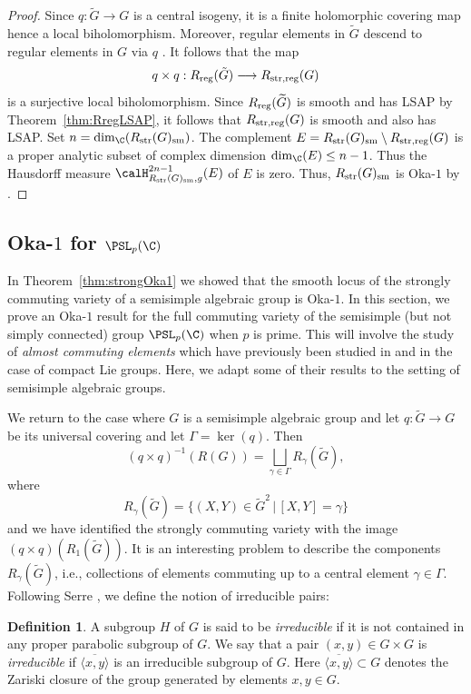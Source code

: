 \documentclass[12pt, a4paper, oneside]{amsart}
\theoremstyle{plain} %
\theoremstyle{definition} %
\newtheorem{definition}[theorem]{Definition}
\theoremstyle{remark} %
\begin{document}
\begin{proof}
Since $q:\widetilde{G}\to G$ is a central isogeny, it is a finite holomorphic covering map hence a local biholomorphism. Moreover, regular elements in $\widetilde{G}$ descend to regular elements in $G$ via $q$ \cite[Proposition 2.3 (2)]{Kur78}. It follows that the map
\[q\times q:R_{\rm reg}(\tilde{G})\longrightarrow R_{\rm str, reg}(G)\]
is a surjective local biholomorphism. Since $R_{\rm reg}(\widetilde{G})$ is smooth and has LSAP by Theorem~\ref{thm:RregLSAP}, it follows that $R_{\rm str, reg}(G)$ is smooth and also has LSAP. Set $n=\dim_\C(R_{\rm str}(G)_{\rm sm})$. The complement $E =R_{\rm str}(G)_{\rm sm}\setminus R_{\rm str, reg}(G)$ is a proper analytic subset of complex dimension $\dim_\C(E)\leq n-1$. Thus the Hausdorff measure $\calH^{2n-1}_{R_{\rm str}(G)_{\rm sm},g}(E)$ of $E$ is zero. Thus, $R_{\rm str}(G)_{\rm sm}$ is Oka-$1$ by \cite[Proposition 7.13  (b)]{AF25}.
\end{proof}

\subsection{Oka-$1$ for $\PSL_p(\C)$}\label{c:Oka1PSLp}
In Theorem~\ref{thm:strongOka1} we showed that the smooth locus of the strongly commuting variety of a semisimple algebraic group is Oka-$1$. In this section, we prove an Oka-$1$ result for the full commuting variety of the semisimple (but not simply connected) group $\PSL_p(\C)$ when $p$ is prime. This will involve the study of \emph{almost commuting elements} which have previously been studied in \cite{BFM02} and \cite{KS00} in the case of compact Lie groups. Here, we adapt some of their results to the setting of semisimple algebraic groups.

\medskip 

We return to the case where $G$ is a semisimple algebraic group and let $q:\widetilde{G}\to G$ be its universal covering and let $\Gamma=\ker(q)$. Then
\[(q\times q)^{-1}(R(G)) = \bigsqcup_{\gamma\in \Gamma}R_\gamma(\widetilde{G}),\]
where 
\[R_{\gamma}(\widetilde{G}) = \{(X,Y)\in \widetilde{G}^2\,|\, [X,Y]=\gamma\}\]
and we have identified the strongly commuting variety with the image $(q\times q)(R_1(\widetilde{G}))$. It is an interesting problem to describe the components $R_\gamma(\widetilde{G})$, i.e., collections of elements commuting up to a central element $\gamma\in \Gamma$. Following Serre \cite{Ser05}, we define the notion of irreducible pairs:  
\begin{definition}
A subgroup $H$ of $G$ is said to be \emph{irreducible} if it is not contained in any proper parabolic subgroup of $G$. We say that a pair $(x,y)\in G\times G$ is \emph{irreducible} if $\overline{\langle x,y\rangle}$ is an irreducible subgroup of $G$. Here $\overline{\langle x,y\rangle}\subset G$ denotes the Zariski closure of the group generated by elements $x,y\in G$.
\end{definition}
\end{document}
